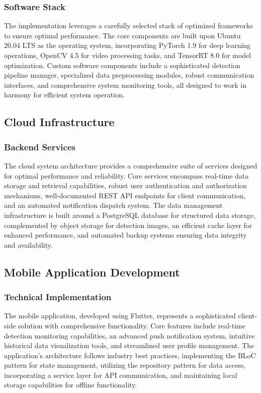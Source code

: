 \subsubsection{Software Stack}
The implementation leverages a carefully selected stack of optimized frameworks to ensure optimal performance. The core components are built upon Ubuntu 20.04 LTS as the operating system, incorporating PyTorch 1.9 for deep learning operations, OpenCV 4.5 for video processing tasks, and TensorRT 8.0 for model optimization. Custom software components include a sophisticated detection pipeline manager, specialized data preprocessing modules, robust communication interfaces, and comprehensive system monitoring tools, all designed to work in harmony for efficient system operation.

\subsection{Cloud Infrastructure}

\subsubsection{Backend Services}
The cloud system architecture provides a comprehensive suite of services designed for optimal performance and reliability. Core services encompass real-time data storage and retrieval capabilities, robust user authentication and authorization mechanisms, well-documented REST API endpoints for client communication, and an automated notification dispatch system. The data management infrastructure is built around a PostgreSQL database for structured data storage, complemented by object storage for detection images, an efficient cache layer for enhanced performance, and automated backup systems ensuring data integrity and availability.

\subsection{Mobile Application Development}

\subsubsection{Technical Implementation}
The mobile application, developed using Flutter, represents a sophisticated client-side solution with comprehensive functionality. Core features include real-time detection monitoring capabilities, an advanced push notification system, intuitive historical data visualization tools, and streamlined user profile management. The application's architecture follows industry best practices, implementing the BLoC pattern for state management, utilizing the repository pattern for data access, incorporating a service layer for API communication, and maintaining local storage capabilities for offline functionality.

